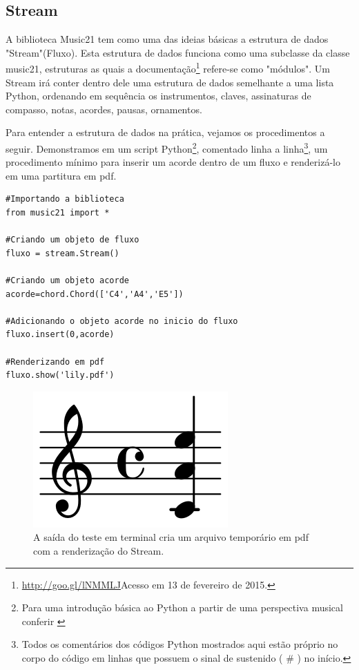 \documentclass[
	12pt,				%
	openright,			%
	twoside,			%
	a4paper,			%
	english,			%
	french,				%
	spanish,			%
	brazil				%
	]{abntex2}
\begin{document}
\subsection{Stream}

A biblioteca Music21 tem como uma das ideias básicas a estrutura de dados "Stream"(Fluxo). Esta estrutura de dados funciona como uma subclasse da classe music21, estruturas as quais a documentação\footnote{\url{http://goo.gl/lNMMLJ}Acesso em 13 de fevereiro de 2015.} refere-se  como "módulos". Um Stream irá conter dentro dele uma estrutura de dados semelhante a uma lista Python, ordenando em sequência os instrumentos, claves, assinaturas de compasso, notas, acordes, pausas, ornamentos.

Para entender a estrutura de dados na prática, vejamos os procedimentos a seguir. Demonstramos em um script Python\footnote{Para uma introdução básica ao Python a partir de uma perspectiva musical conferir \cite{Kroger201208} }, comentado linha a linha\footnote{Todos os comentários dos códigos Python mostrados aqui estão próprio no corpo do código em linhas que possuem o sinal de sustenido ( \# ) no início.}, um procedimento mínimo para inserir um acorde dentro de um fluxo e renderizá-lo em uma partitura em pdf.

 
\begin{lstlisting}
#Importando a biblioteca
from music21 import *

#Criando um objeto de fluxo 
fluxo = stream.Stream()

#Criando um objeto acorde
acorde=chord.Chord(['C4','A4','E5'])

#Adicionando o objeto acorde no inicio do fluxo
fluxo.insert(0,acorde)

#Renderizando em pdf
fluxo.show('lily.pdf')
\end{lstlisting}
 

\begin{figure}[!h]
	\caption{\label{fig_grafico} A saída do teste em terminal cria um arquivo temporário em pdf com a renderização do Stream.}
	\begin{center}
	    \includegraphics[scale=0.3]{estudosM21/acorde01.png}
	\end{center}
\end{figure}
\end{document}
